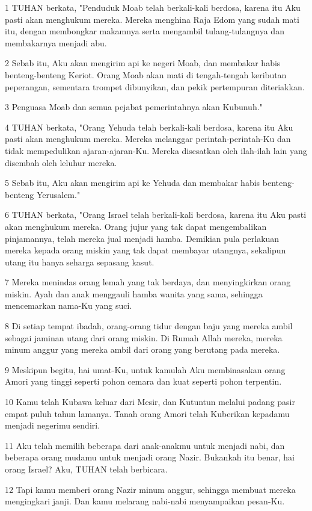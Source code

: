 \par 1 TUHAN berkata, "Penduduk Moab telah berkali-kali berdosa, karena itu Aku pasti akan menghukum mereka. Mereka menghina Raja Edom yang sudah mati itu, dengan membongkar makamnya serta mengambil tulang-tulangnya dan membakarnya menjadi abu.
\par 2 Sebab itu, Aku akan mengirim api ke negeri Moab, dan membakar habis benteng-benteng Keriot. Orang Moab akan mati di tengah-tengah keributan peperangan, sementara trompet dibunyikan, dan pekik pertempuran diteriakkan.
\par 3 Penguasa Moab dan semua pejabat pemerintahnya akan Kubunuh."
\par 4 TUHAN berkata, "Orang Yehuda telah berkali-kali berdosa, karena itu Aku pasti akan menghukum mereka. Mereka melanggar perintah-perintah-Ku dan tidak mempedulikan ajaran-ajaran-Ku. Mereka disesatkan oleh ilah-ilah lain yang disembah oleh leluhur mereka.
\par 5 Sebab itu, Aku akan mengirim api ke Yehuda dan membakar habis benteng-benteng Yerusalem."
\par 6 TUHAN berkata, "Orang Israel telah berkali-kali berdosa, karena itu Aku pasti akan menghukum mereka. Orang jujur yang tak dapat mengembalikan pinjamannya, telah mereka jual menjadi hamba. Demikian pula perlakuan mereka kepada orang miskin yang tak dapat membayar utangnya, sekalipun utang itu hanya seharga sepasang kasut.
\par 7 Mereka menindas orang lemah yang tak berdaya, dan menyingkirkan orang miskin. Ayah dan anak menggauli hamba wanita yang sama, sehingga mencemarkan nama-Ku yang suci.
\par 8 Di setiap tempat ibadah, orang-orang tidur dengan baju yang mereka ambil sebagai jaminan utang dari orang miskin. Di Rumah Allah mereka, mereka minum anggur yang mereka ambil dari orang yang berutang pada mereka.
\par 9 Meskipun begitu, hai umat-Ku, untuk kamulah Aku membinasakan orang Amori yang tinggi seperti pohon cemara dan kuat seperti pohon terpentin.
\par 10 Kamu telah Kubawa keluar dari Mesir, dan Kutuntun melalui padang pasir empat puluh tahun lamanya. Tanah orang Amori telah Kuberikan kepadamu menjadi negerimu sendiri.
\par 11 Aku telah memilih beberapa dari anak-anakmu untuk menjadi nabi, dan beberapa orang mudamu untuk menjadi orang Nazir. Bukankah itu benar, hai orang Israel? Aku, TUHAN telah berbicara.
\par 12 Tapi kamu memberi orang Nazir minum anggur, sehingga membuat mereka mengingkari janji. Dan kamu melarang nabi-nabi menyampaikan pesan-Ku.
